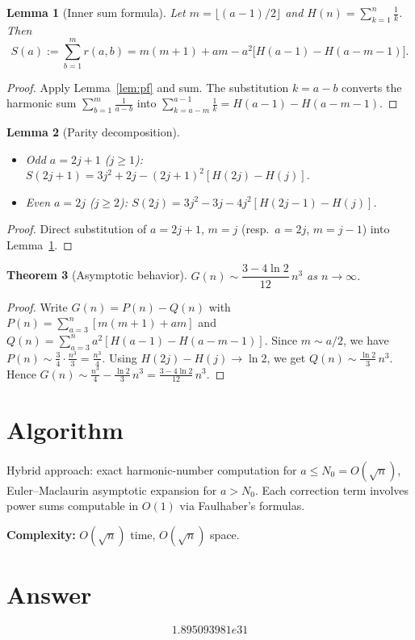 \documentclass[11pt]{article}
\newtheorem{theorem}{Theorem}
\newtheorem{lemma}[theorem]{Lemma}
\begin{document}
\begin{lemma}[Inner sum formula]\label{lem:inner}
Let $m = \lfloor(a-1)/2\rfloor$ and $H(n) = \sum_{k=1}^{n}\frac{1}{k}$. Then
\[
S(a) := \sum_{b=1}^{m} r(a,b) = m(m+1) + am - a^2\bigl[H(a-1) - H(a-m-1)\bigr].
\]
\end{lemma}

\begin{proof}
Apply Lemma~\ref{lem:pf} and sum. The substitution $k = a-b$ converts the
harmonic sum $\sum_{b=1}^{m}\frac{1}{a-b}$ into $\sum_{k=a-m}^{a-1}\frac{1}{k}
= H(a-1) - H(a-m-1)$.
\end{proof}

\begin{lemma}[Parity decomposition]\label{lem:parity}
\leavevmode
\begin{itemize}
\item Odd $a=2j+1$ ($j \ge 1$):
$S(2j+1) = 3j^2+2j - (2j+1)^2[H(2j)-H(j)]$.
\item Even $a=2j$ ($j \ge 2$):
$S(2j) = 3j^2-3j - 4j^2[H(2j-1)-H(j)]$.
\end{itemize}
\end{lemma}

\begin{proof}
Direct substitution of $a=2j+1$, $m=j$ (resp.\ $a=2j$, $m=j-1$) into Lemma~\ref{lem:inner}.
\end{proof}

\begin{theorem}[Asymptotic behavior]
$G(n) \sim \dfrac{3-4\ln 2}{12}\,n^3$ as $n \to \infty$.
\end{theorem}

\begin{proof}
Write $G(n) = P(n) - Q(n)$ with $P(n) = \sum_{a=3}^{n}[m(m+1)+am]$ and
$Q(n) = \sum_{a=3}^{n}a^2[H(a-1)-H(a-m-1)]$.
Since $m \sim a/2$, we have $P(n) \sim \frac{3}{4}\cdot\frac{n^3}{3} = \frac{n^3}{4}$.
Using $H(2j)-H(j) \to \ln 2$, we get
$Q(n) \sim \frac{\ln 2}{3}\,n^3$.
Hence $G(n) \sim \frac{n^3}{4} - \frac{\ln 2}{3}\,n^3 = \frac{3-4\ln 2}{12}\,n^3$.
\end{proof}

\section{Algorithm}

Hybrid approach: exact harmonic-number computation for $a \le N_0 = O(\sqrt{n})$,
Euler--Maclaurin asymptotic expansion for $a > N_0$. Each correction term
involves power sums computable in $O(1)$ via Faulhaber's formulas.

\textbf{Complexity:} $O(\sqrt{n})$ time, $O(\sqrt{n})$ space.

\section{Answer}

\[
\boxed{1.895093981e31}
\]
\end{document}
